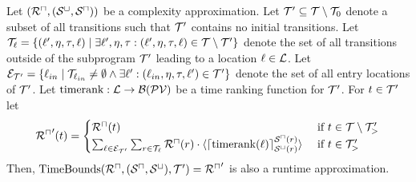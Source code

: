 \begin{theorem}[TimeBounds]
  Let $({\mathcal{R}^\sqcap}, {({\mathcal{S}^\sqcup}, {\mathcal{S}^\sqcap})})$ be a complexity approximation.
  Let $\mathcal{T}' \subseteq \mathcal{T} \setminus \mathcal{T}_0$ denote a subset of all transitions such that $\mathcal{T}'$ contains no initial transitions.
  Let $\mathcal{T}_{\ell} = \lbrace (\ell', \eta, \tau, \ell) \mid \exists \ell', \eta, \tau: (\ell', \eta, \tau, \ell) \in \mathcal{T} \setminus \mathcal{T}' \rbrace$ denote the set of all transitions outside of the subprogram $\mathcal{T}'$ leading to a location $\ell \in \mathcal{L}$.
  Let $\mathcal{E}_{\mathcal{T}'} = \lbrace \ell_{in} \mid \mathcal{T}_{\ell_{in}} \neq \emptyset \wedge \exists \ell': (\ell_{in}, \eta, \tau, \ell') \in \mathcal{T}' \rbrace$ denote the set of all entry locations of $\mathcal{T}'$.
  Let $\text{timerank}: \mathcal{L} \rightarrow \mathcal{B}(\mathcal{PV})$ be a time ranking function for $\mathcal{T}'$.
  For $t \in \mathcal{T}'$ let
  \[ {\mathcal{R}^\sqcap}'(t) = 
  \begin{cases}
    {\mathcal{R}^\sqcap}(t) & \text{ if } t \in \mathcal{T} \setminus \mathcal{T}'_> \\
    \sum_{\ell \in \mathcal{E}_{\mathcal{T}'}} \sum_{r \in \mathcal{T}_\ell} {\mathcal{R}^\sqcap}(r) \cdot \langle\lceil \text{timerank}(\ell) \rceil^{{\mathcal{S}^\sqcap}(r)}_{{\mathcal{S}^\sqcup}(r)}\rangle & \text{ if } t \in \mathcal{T}'_>
  \end{cases}
  \]
  Then, $\text{TimeBounds}({\mathcal{R}^\sqcap}, ({\mathcal{S}^\sqcap}, {\mathcal{S}^\sqcup}), \mathcal{T}') = {\mathcal{R}^\sqcap}'$ is also a runtime approximation.
\end{theorem}
